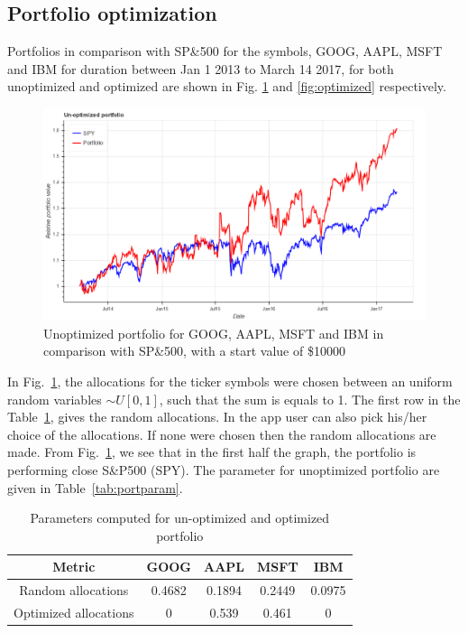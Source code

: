 \documentclass[12pt]{article}
\begin{document}
\begin{itemize}
\subsection{Portfolio optimization}
\label{sec:opt}

Portfolios in comparison with SP\&500 for the symbols, GOOG, AAPL, MSFT and IBM for duration between Jan 1 2013 to March 14 2017, for both unoptimized and optimized are shown in Fig. \ref{fig:unoptimized} and \ref{fig:optimized} respectively.

\begin{figure}[!htbp]
\begin{center}
\includegraphics[height=0.5\textheight,width=\textwidth]{unoptimized.png}
\caption{Unoptimized portfolio for GOOG, AAPL, MSFT and IBM in comparison with SP\&500, with a start value of \$10000}
\label{fig:unoptimized}
\end{center}
\end{figure}

In Fig.~\ref{fig:unoptimized}, the allocations for the ticker symbols were chosen between an uniform random variables $\sim U[0,1]$, such that the sum is equals to 1. The first row in the Table~\ref{tab:alloc}, gives the random allocations. In the app  \href{http://quantfy.herokuapp.com/portfolio}{\color{blue}{http://quantfy.herokuapp.com/portfolio}} user can also pick his/her choice of the allocations. If none were chosen then the random allocations are made. From Fig.~\ref{fig:unoptimized}, we see that in the first half the graph, the portfolio is performing close S\&P500 (SPY). The parameter for unoptimized portfolio are given in Table~\ref{tab:portparam}.

\begin{table}
\begin{center}
\begin{tabular} {|c|c|c|c|c|}
\hline \hline
\textbf{Metric} & \textbf{GOOG} & \textbf{AAPL} & \textbf{MSFT} & \textbf{IBM} \\ \hline
Random allocations & 0.4682 & 0.1894 &0.2449 &0.0975 \\ \hline
Optimized allocations & 0 & 0.539 & 0.461 & 0 \\ \hline
\hline
\end{tabular}
\end{center}
\caption{Parameters computed for un-optimized and optimized portfolio}
\label{tab:alloc}
\end{table}


\end{itemize}
\end{document}
